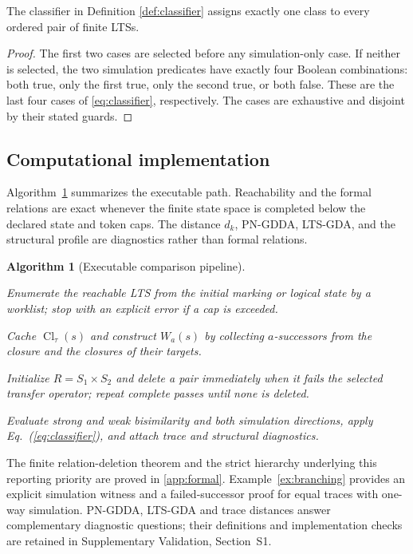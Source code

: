 \documentclass{ws-jbcb}
\newtheorem{algorithm}{Algorithm}
\numberwithin{equation}{section}
\newcommand{\TAU}{\tau}
\begin{document}
\begin{proposition}\label{prop:classifier}
The classifier in Definition \ref{def:classifier} assigns exactly one class to
every ordered pair of finite LTSs.
\end{proposition}

\begin{proof}
The first two cases are selected before any simulation-only case. If neither is
selected, the two simulation predicates have exactly four Boolean combinations:
both true, only the first true, only the second true, or both false. These are the
last four cases of \eqref{eq:classifier}, respectively. The cases are exhaustive
and disjoint by their stated guards.
\end{proof}

\subsection{Computational implementation}\label{sec:algorithms}

Algorithm~\ref{alg:pipeline} summarizes the executable path. Reachability and
the formal relations are exact whenever the finite state space is completed
below the declared state and token caps. The distance $d_k$, PN-GDDA, LTS-GDA,
and the structural profile are diagnostics rather than formal relations.

\begin{algorithm}[Executable comparison pipeline]\label{alg:pipeline}
\begin{romanlist}[(iv)]
\item Enumerate the reachable LTS from the initial marking or logical state by a
worklist; stop with an explicit error if a cap is exceeded.
\item Cache $\operatorname{Cl}_{\TAU}(s)$ and construct $W_a(s)$ by collecting
$a$-successors from the closure and the closures of their targets.
\item Initialize $R=S_1\times S_2$ and delete a pair immediately when it fails
the selected transfer operator; repeat complete passes until none is deleted.
\item Evaluate strong and weak bisimilarity and both simulation directions,
apply Eq.~(\ref{eq:classifier}), and attach trace and structural diagnostics.
\end{romanlist}
\end{algorithm}

The finite relation-deletion theorem and the strict hierarchy underlying
this reporting priority are proved in \ref{app:formal}.
Example~\ref{ex:branching} provides an explicit simulation witness and
a failed-successor proof for equal traces with one-way simulation.
PN-GDDA, LTS-GDA and trace distances answer complementary diagnostic
questions; their definitions and implementation checks are retained in
Supplementary Validation, Section~S1.
\end{document}
